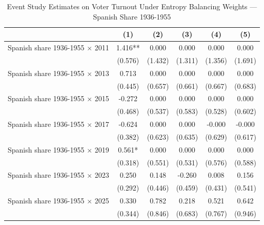 \begin{table}[!h]
\caption{Event Study Estimates on Voter Turnout Under Entropy Balancing Weights — Spanish Share 1936-1955}
\renewcommand{\arraystretch}{1.25}
\centering
\begin{tabular}[t]{lccccc}
\hline
  & (1) & (2) & (3) & (4) & (5)\\
\hline
Spanish share 1936-1955 $\times$ 2011 & 1.416** & 0.000 & 0.000 & 0.000 & 0.000\\
 & (0.576) & (1.432) & (1.311) & (1.356) & (1.691)\\
Spanish share 1936-1955 $\times$ 2013 & 0.713 & 0.000 & 0.000 & 0.000 & 0.000\\
 & (0.445) & (0.657) & (0.661) & (0.667) & (0.683)\\
Spanish share 1936-1955 $\times$ 2015 & -0.272 & 0.000 & 0.000 & 0.000 & 0.000\\
 & (0.468) & (0.537) & (0.583) & (0.528) & (0.602)\\
Spanish share 1936-1955 $\times$ 2017 & -0.624 & 0.000 & 0.000 & -0.000 & -0.000\\
 & (0.382) & (0.623) & (0.635) & (0.629) & (0.617)\\
Spanish share 1936-1955 $\times$ 2019 & 0.561* & 0.000 & 0.000 & 0.000 & 0.000\\
 & (0.318) & (0.551) & (0.531) & (0.576) & (0.588)\\
Spanish share 1936-1955 $\times$ 2023 & 0.250 & 0.148 & -0.260 & 0.008 & 0.156\\
 & (0.292) & (0.446) & (0.459) & (0.431) & (0.541)\\
Spanish share 1936-1955 $\times$ 2025 & 0.330 & 0.782 & 0.218 & 0.521 & 0.642\\
 & (0.344) & (0.846) & (0.683) & (0.767) & (0.946)\\


\end{tabular}
\end{table}
